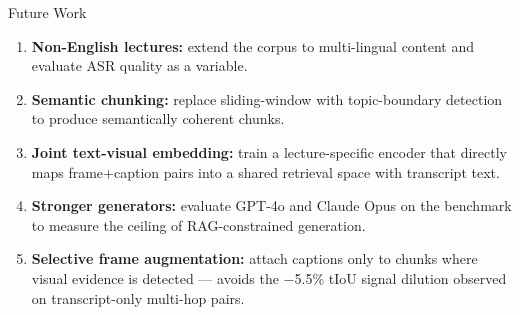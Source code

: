 \documentclass[aspectratio=169,t]{beamer}
\begin{document}
\begin{frame}{Future Work}

\begin{enumerate}
  \setlength{\itemsep}{10pt}
  \item \textbf{Non-English lectures:} extend the corpus to multi-lingual content
        and evaluate ASR quality as a variable.

  \item \textbf{Semantic chunking:} replace sliding-window with topic-boundary detection
        to produce semantically coherent chunks.

  \item \textbf{Joint text-visual embedding:} train a lecture-specific encoder that
        directly maps frame+caption pairs into a shared retrieval space with transcript text.

  \item \textbf{Stronger generators:} evaluate GPT-4o and Claude Opus on the benchmark
        to measure the ceiling of RAG-constrained generation.

  \item \textbf{Selective frame augmentation:} attach captions only to chunks where
        visual evidence is detected — avoids the $-$5.5\% tIoU signal dilution observed
        on transcript-only multi-hop pairs.
\end{enumerate}

\end{frame}
\end{document}
